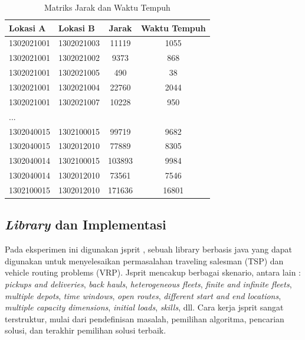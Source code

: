 \begin{table}
	\centering
	\caption{Matriks Jarak dan Waktu Tempuh}
	\label{tbl:distance_duration_matrix}
	\begin{tabular}{llcc}
		\toprule
			Lokasi A & Lokasi B & Jarak & Waktu Tempuh\\
		\midrule
			1302021001 & 1302021003 & 11119 & 1055\\
			1302021001 & 1302021002 & 9373 & 868\\
			1302021001 & 1302021005 & 490 & 38\\
			1302021001 & 1302021004 & 22760 & 2044\\
			1302021001 & 1302021007 & 10228 & 950\\
			...\\
			1302040015 & 1302100015 & 99719 & 9682\\
			1302040015 & 1302012010 & 77889 & 8305\\
			1302040014 & 1302100015 & 103893 & 9984\\
			1302040014 & 1302012010 & 73561 & 7546\\
			1302100015 & 1302012010 & 171636 & 16801\\
		\bottomrule
	\end{tabular}
\end{table}


\subsection{\textit{Library} dan Implementasi}
Pada eksperimen ini digunakan jsprit \citep{jsprit_jsprit_2014}, sebuah library berbasis java yang dapat digunakan untuk menyelesaikan permasalahan traveling salesman (TSP) dan vehicle routing problems (VRP). Jsprit mencakup berbagai skenario, antara lain : \textit{pickups and deliveries}, \textit{back hauls}, \textit{heterogeneous fleets}, \textit{finite and infinite fleets}, \textit{multiple depots}, \textit{time windows}, \textit{open routes}, \textit{different start and end locations}, \textit{multiple capacity dimensions}, \textit{initial loads}, \textit{skills}, dll. Cara kerja jsprit sangat terstruktur, mulai dari pendefinisan masalah, pemilihan algoritma, pencarian solusi, dan terakhir pemilihan solusi terbaik.


